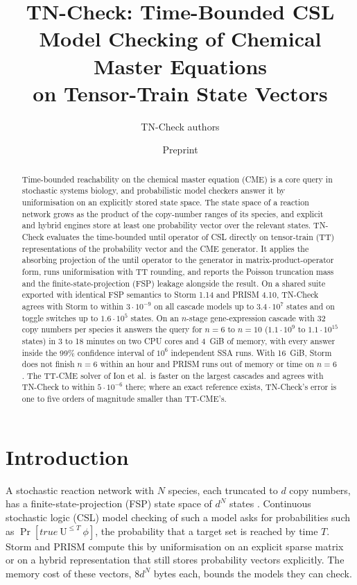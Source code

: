 \documentclass[11pt]{article}
\title{TN-Check: Time-Bounded CSL Model Checking of Chemical Master Equations\\ on Tensor-Train State Vectors}
\author{TN-Check authors}
\date{Preprint}
\begin{document}
\maketitle

\begin{abstract}
Time-bounded reachability on the chemical master equation (CME) is a core query
in stochastic systems biology, and probabilistic model checkers answer it by
uniformisation on an explicitly stored state space. The state space of a reaction
network grows as the product of the copy-number ranges of its species, and
explicit and hybrid engines store at least one probability vector over the
relevant states. TN-Check evaluates the time-bounded until operator of CSL
directly on tensor-train (TT) representations of the probability vector and the
CME generator. It applies the absorbing projection of the until operator to the
generator in matrix-product-operator form, runs uniformisation with TT rounding,
and reports the Poisson truncation mass and the finite-state-projection (FSP)
leakage alongside the result. On a shared suite exported with identical FSP
semantics to Storm 1.14 and PRISM 4.10, TN-Check agrees with Storm to within
$3\cdot10^{-9}$ on all cascade models up to $3.4\cdot10^7$ states and on toggle
switches up to $1.6\cdot10^5$ states. On an $n$-stage gene-expression cascade
with 32 copy numbers per species it answers the query for $n=6$ to $n=10$
($1.1\cdot10^{9}$ to $1.1\cdot10^{15}$ states) in 3 to 18 minutes on two CPU
cores and 4~GiB of memory, with every answer inside the 99\% confidence interval
of $10^6$ independent SSA runs. With 16~GiB, Storm does not finish $n=6$ within
an hour and PRISM runs out of memory or time on $n=6$. The TT-CME solver of Ion et
al.\ is faster on the largest cascades and agrees with TN-Check to within
$5\cdot10^{-6}$ there; where an exact reference exists, TN-Check's error is one to
five orders of magnitude smaller than TT-CME's.
\end{abstract}

\section{Introduction}

A stochastic reaction network with $N$ species, each truncated to $d$ copy numbers,
has a finite-state-projection (FSP) state space of $d^N$ states
\cite{munsky2006fsp}. Continuous stochastic logic (CSL) model checking of such a
model asks for probabilities such as $\Pr[\mathit{true}\ \mathrm{U}^{\le T}\ \phi]$,
the probability that a target set is reached by time $T$. Storm
\cite{hensel2022storm} and PRISM \cite{kwiatkowska2011prism} compute this by
uniformisation \cite{baier2003csl,fox1988poisson} on an explicit sparse matrix or
on a hybrid representation that still stores probability vectors explicitly. The
memory cost of these vectors, $8 d^N$ bytes each, bounds the models they can
check.
\end{document}
